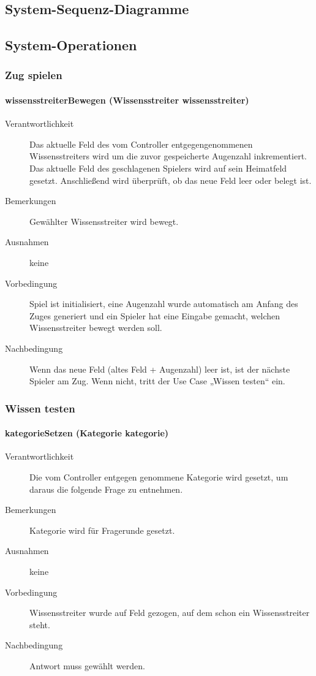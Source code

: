 \documentclass{report}
\begin{document}
\begin{description}
\begin{description}
\subsection{System-Sequenz-Diagramme}


\subsection{System-Operationen}
\subsubsection{Zug spielen}
\paragraph{wissensstreiterBewegen (Wissensstreiter wissensstreiter)}
\begin{description}
	\item[Verantwortlichkeit] Das aktuelle Feld des vom Controller entgegengenommenen Wissensstreiters wird um die zuvor gespeicherte Augenzahl inkrementiert. Das aktuelle Feld des geschlagenen Spielers wird auf sein Heimatfeld gesetzt. Anschließend wird überprüft, ob das neue Feld leer oder belegt ist.
	\item[Bemerkungen] Gewählter Wissensstreiter wird bewegt.
	\item[Ausnahmen] keine
	\item[Vorbedingung] Spiel ist initialisiert, eine Augenzahl wurde automatisch am Anfang des Zuges generiert und ein Spieler hat eine Eingabe gemacht, welchen Wissensstreiter bewegt werden soll.
	\item[Nachbedingung] Wenn das neue Feld (altes Feld + Augenzahl) leer ist, ist der nächste Spieler am Zug. Wenn nicht, tritt der Use Case „Wissen testen“ ein.
\end{description}

\subsubsection{Wissen testen}
\paragraph{kategorieSetzen (Kategorie kategorie)}
\begin{description}
	\item[Verantwortlichkeit] Die vom Controller entgegen genommene Kategorie wird gesetzt, um daraus die folgende Frage zu entnehmen.
	\item[Bemerkungen]  Kategorie wird für Fragerunde gesetzt.
	\item[Ausnahmen] keine
	\item[Vorbedingung] Wissensstreiter wurde auf Feld gezogen, auf dem schon ein Wissensstreiter steht.
	\item[Nachbedingung] Antwort muss gewählt werden.
\end{description}


\end{description}
\end{description}
\end{document}
